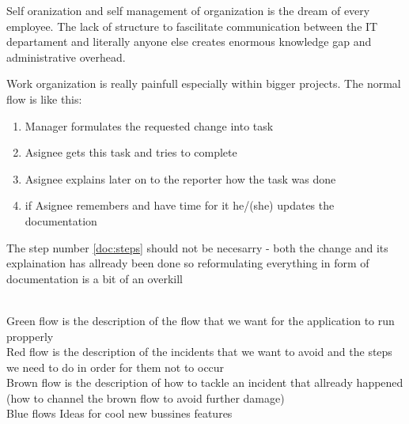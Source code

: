 \label{customer}
\label{customer:1}
Self oranization and self management of organization is the dream of every employee. 
\label{customer:2}
The lack of structure to fascilitate communication between the IT departament and 
literally anyone else creates enormous knowledge gap and administrative overhead.
\label{customer:3}

\label{prob}
\label{prob:1}
Work organization is really painfull especially within bigger projects.
\label{prob:2}
The normal flow is like this:
\begin{enumerate}
  \item Manager formulates the requested change into task
  \item Asignee gets this task and tries to complete 
  \item Asignee explains later on to the reporter how the task was done
  \item if Asignee remembers and have time for it he/(she) updates the documentation\label{doc:steps}
\end{enumerate}
The step number \ref*{doc:steps} should not be necesarry - both the change and its explaination 
has allready been done so reformulating everything in form of documentation is a bit of an overkill

\label{sol}
\label{sol:1}
\secstarter
{}\label{sol:1:1}
\\Green flow is the description of the flow that we want for the application to run propperly
\label{sol:1:2}
\\Red flow is the description of the incidents that we want to avoid and the steps we need to do in order for them not to occur
\label{sol:1:3}
\\Brown flow is the description of how to tackle an incident that allready happened (how to channel the brown flow to avoid further damage)
\secend
{}\label{sol:2}
\secstarter
{}\label{sol:2:1}
\\Blue flows Ideas for cool new bussines features
\label{sol:2:2}
\secend

\label{uvp}
\label{uvp:1}



